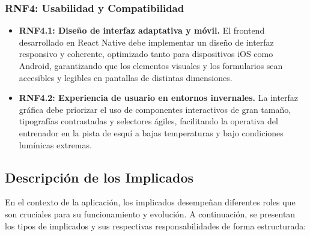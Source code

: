         \subsubsection*{RNF4: Usabilidad y Compatibilidad}
        \begin{itemize}
            \item \textbf{RNF4.1: Diseño de interfaz adaptativa y móvil.} El frontend desarrollado en React Native debe implementar un diseño de interfaz responsivo y coherente, optimizado tanto para dispositivos iOS como Android, garantizando que los elementos visuales y los formularios sean accesibles y legibles en pantallas de distintas dimensiones.
            \item \textbf{RNF4.2: Experiencia de usuario en entornos invernales.} La interfaz gráfica debe priorizar el uso de componentes interactivos de gran tamaño, tipografías contrastadas y selectores ágiles, facilitando la operativa del entrenador en la pista de esquí a bajas temperaturas y bajo condiciones lumínicas extremas.
        \end{itemize}

        \subsection{Descripción de los Implicados}

        En el contexto de la aplicación, los implicados desempeñan diferentes roles que son cruciales para su funcionamiento y evolución. A continuación, se presentan los tipos de implicados y sus respectivas responsabilidades de forma estructurada:

